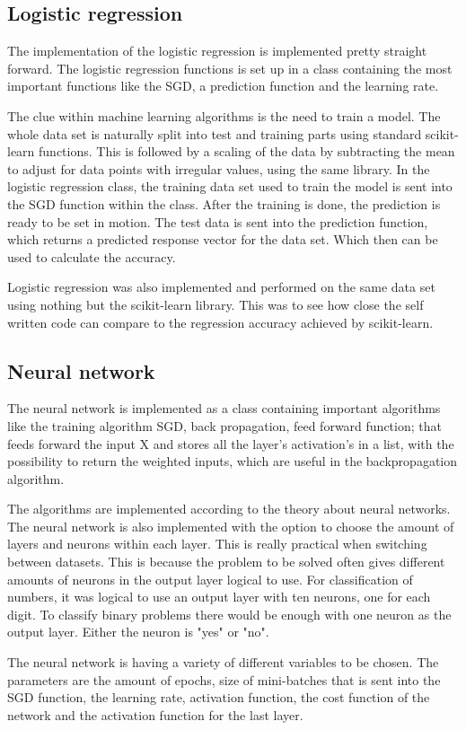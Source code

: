 \documentclass[../main.tex]{subfiles}
\begin{document}
\subsection{Logistic regression}\label{sec:3logreg}
The implementation of the logistic regression is implemented pretty straight forward. The logistic regression functions is set up in a class containing the most important functions like the SGD, a prediction function and the learning rate.

The clue within machine learning algorithms is the need to train a model. The whole data set is naturally split into test and training parts using standard scikit-learn functions. This is followed by a scaling of the data by subtracting the mean to adjust for data points with irregular values, using the same library. In the logistic regression class, the training data set used to train the model is sent into the SGD function within the class. After the training is done, the prediction is ready to be set in motion. The test data is sent into the prediction function, which returns a predicted response vector for the data set. Which then can be used to calculate the accuracy.

Logistic regression was also implemented and performed on the same data set using nothing but the scikit-learn library. This was to see how close the self written code can compare to the regression accuracy achieved by scikit-learn.

\subsection{Neural network}
The neural network is implemented as a class containing important algorithms like the training algorithm SGD, back propagation, feed forward function; that feeds forward the input X and stores all the layer's activation's in a list, with the possibility to return the weighted inputs, which are useful in the backpropagation algorithm.

The algorithms are implemented according to the theory about neural networks. The neural network is also implemented with the option to choose the amount of layers and neurons within each layer. This is really practical when switching between datasets. This is because the problem to be solved often gives different amounts of neurons in the output layer logical to use. For classification of numbers, it was logical to use an output layer with ten neurons, one for each digit. To classify binary problems there would be enough with one neuron as the output layer. Either the neuron is "yes" or "no".

The neural network is having a variety of different variables to be chosen. The parameters are the amount of epochs, size of mini-batches that is sent into the SGD function, the learning rate, activation function, the cost function of the network and the activation function for the last layer.
\end{document}
